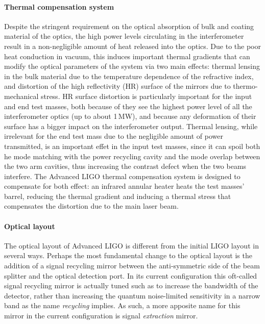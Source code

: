 \paragraph*{Thermal compensation system}
Despite the stringent requirement on the optical absorption of bulk and coating 
material of the optics, the high power levels circulating in the interferometer result 
in a non-negligible amount of heat released into the optics.
Due to the poor heat conduction in vacuum, this induces important thermal gradients that can modify 
the optical parameters of the system via two main effects: thermal lensing in the 
bulk material due to the temperature dependence of the refractive index,
and distortion of the high reflectivity (HR) surface of the mirrors due to thermo-mechanical stress.
HR surface distortion is particularly important for the input and end test masses, both because of they see the highest power level of all the interferometer optics (up to about 1\,MW), and because any deformation of their surface has a bigger impact on the interferometer output.
Thermal lensing, while irrelevant for the end test mass due to the negligible amount of power transmitted, is an important effet in the input test masses, since it can spoil both he mode matching with the power recycling cavity and the mode overlap between the two arm cavities, thus increasing the contrast defect when the two beams interfere.
The Advanced LIGO thermal compensation system is designed to compensate for both effect: an infrared annular heater heats the test masses' barrel, reducing the thermal gradient and inducing a thermal stress that compensates the distortion due to the main laser beam. 

\paragraph*{Optical layout}
The optical layout of Advanced LIGO is different from the initial LIGO layout in several ways. 
Perhaps the most fundamental change to the optical layout is the addition of a signal recycling 
mirror between the anti-symmetric side of the beam splitter and the optical detection port. 
In its current configuration this oft-called signal recycling mirror is actually tuned such as to 
increase the bandwidth of the detector, rather than increasing the quantum noise-limited sensitivity
in a narrow band as the name \emph{recycling} implies. As such, a more apposite name for this mirror 
in the current configuration is signal \emph{extraction} mirror. 

